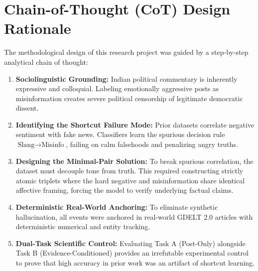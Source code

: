 \documentclass[11pt,a4paper]{article}
\begin{document}
\section{Chain-of-Thought (CoT) Design Rationale}
The methodological design of this research project was guided by a step-by-step analytical chain of thought:
\begin{enumerate}[leftmargin=*]
    \item \textbf{Sociolinguistic Grounding:} Indian political commentary is inherently expressive and colloquial. Labeling emotionally aggressive posts as misinformation creates severe political censorship of legitimate democratic dissent.
    \item \textbf{Identifying the Shortcut Failure Mode:} Prior datasets correlate negative sentiment with fake news. Classifiers learn the spurious decision rule $\text{Slang} \rightarrow \text{Misinfo}$, failing on calm falsehoods and penalizing angry truths.
    \item \textbf{Designing the Minimal-Pair Solution:} To break spurious correlation, the dataset must decouple tone from truth. This required constructing strictly atomic triplets where the hard negative and misinformation share identical affective framing, forcing the model to verify underlying factual claims.
    \item \textbf{Deterministic Real-World Anchoring:} To eliminate synthetic hallucination, all events were anchored in real-world GDELT 2.0 articles with deterministic numerical and entity tracking.
    \item \textbf{Dual-Task Scientific Control:} Evaluating Task A (Post-Only) alongside Task B (Evidence-Conditioned) provides an irrefutable experimental control to prove that high accuracy in prior work was an artifact of shortcut learning.
\end{enumerate}
\end{document}
